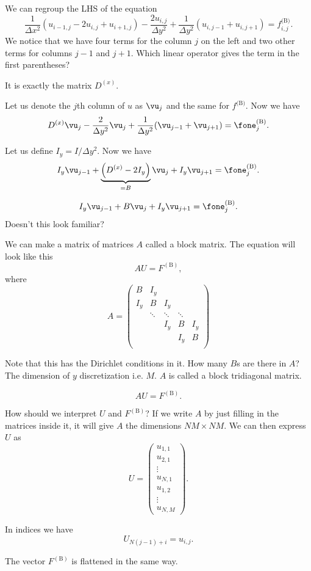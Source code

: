 \begin{frame}
	We can regroup the LHS of the equation
	\[ \frac{1}{\Delta x^2}(u_{i-1,j} - 2 u_{i,j} + u_{i+1,j}) -  \frac{2 u_{i,j}}{\Delta y^2}
	+ \frac{1}{\Delta y^2}(u_{i,j-1} + u_{i,j+1}) = f^\text{(B)}_{i,j}.
	\]
	We notice that we have four terms for the column $ j $ on the left and two other terms for columns $ j-1 $ and $ j+1 $. Which linear operator gives the term in the first parentheses?
	
	\pause
	It is exactly the matrix $ D^{(x)} $. 
	
	\pause
	Let us denote the $ j $th column of $ u $ as $ \vu_j $ and the same for $ f^\text{(B)} $. Now we have
	\[ D^{(x)} \vu_j -  \frac{2}{\Delta y^2} \vu_j
	+ \frac{1}{\Delta y^2}(\vu_{j-1} + \vu_{j+1}) = \fone^\text{(B)}_j. \]
	
	\pause
	Let us define $ I_y = I/\Delta y^2 $. Now we have
	\[ I_y \vu_{j-1} +  \underbrace{\left(D^{(x)} - 2 I_y \right)}_{=B} \vu_j + I_y \vu_{j+1} = \fone^\text{(B)}_j. \]
\end{frame}

\begin{frame}
	\[ I_y \vu_{j-1} +  B \vu_j + I_y \vu_{j+1} = \fone^\text{(B)}_j. \]
	Doesn't this look familiar?
	
	\pause
	We can make a matrix of matrices $ A $ called a block matrix. The equation will look like this
	\[ A U = F^{(\text{B})}, \]
	where
	\[ A = \begin{pmatrix}
		B   & I_y & && \\
		I_y & B   & I_y && \\
		    & \ddots & \ddots & \ddots& \\
		    &    & I_y & B   & I_y \\
		    &      &    & I_y & B   \\
	\end{pmatrix} \]

	\pause
	Note that this has the Dirichlet conditions in it. How many $ B $s are there in $ A $? \pause The dimension of $ y $ discretization i.e. $ M $. $ A $ is called a block tridiagonal matrix.
\end{frame}

\begin{frame}
	\[ A U = F^{(\text{B})}. \]
	
	How should we interpret $ U $ and $ F^{(\text{B})} $? If we write $ A $ by just filling in the matrices inside it, it will give $ A $ the dimensions $ NM \times NM $. We can then express $ U $ as 
	\[ U = \begin{pmatrix}
		u_{1,1} \\
		u_{2,1} \\
		\vdots \\
		u_{N,1} \\
		u_{1,2} \\
		\vdots \\
		u_{N,M}
	\end{pmatrix}. \]
	
	\pause
	In indices we have 
	\[ U_{N(j-1) + i} = u_{i,j}. \] 
	
	\pause
	The vector $ F^{(\text{B})} $ is flattened in the same way.
\end{frame}

